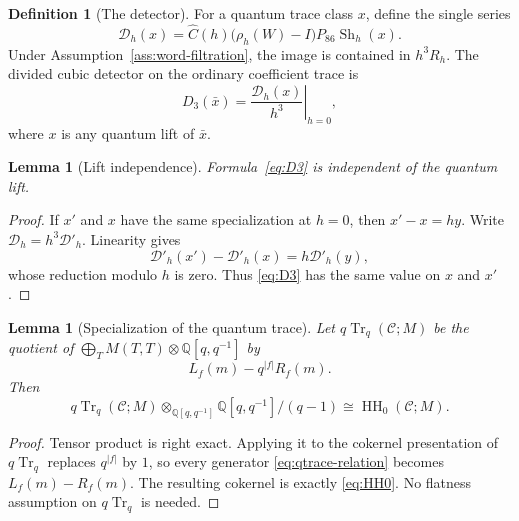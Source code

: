 \documentclass[10pt,reqno]{amsart}
\newtheorem{lemma}[theorem]{Lemma}
\theoremstyle{definition}
\newtheorem{definition}[theorem]{Definition}
\theoremstyle{remark}
\newcommand{\Q}{\mathbb Q}
\newcommand{\HH}{\operatorname{HH}}
\newcommand{\qTr}{q\!\operatorname{Tr}}
\newcommand{\Sh}{\operatorname{Sh}}
\begin{document}
\begin{definition}[The detector]\label{def:detector}
For a quantum trace class $x$, define the single series
\begin{equation}\label{eq:D-h}
\mathcal D_h(x)=
\widehat C(h)\bigl(\rho_h(W)-I\bigr)P_{86}\Sh_h(x).
\end{equation}
Under Assumption~\ref{ass:word-filtration}, the image is contained in
$h^3R_h$.  The divided cubic detector on the ordinary coefficient trace is
\begin{equation}\label{eq:D3}
D_3(\bar x)=\left.\frac{\mathcal D_h(x)}{h^3}\right|_{h=0},
\end{equation}
where $x$ is any quantum lift of $\bar x$.
\end{definition}

\begin{lemma}[Lift independence]\label{lem:lift-independence}
Formula~\eqref{eq:D3} is independent of the quantum lift.
\end{lemma}

\begin{proof}
If $x'$ and $x$ have the same specialization at $h=0$, then
$x'-x=hy$.  Write $\mathcal D_h=h^3\mathcal D'_h$.  Linearity gives
\begin{equation}\label{eq:lift-difference}
\mathcal D'_h(x')-\mathcal D'_h(x)=h\mathcal D'_h(y),
\end{equation}
whose reduction modulo $h$ is zero.  Thus \cref{eq:D3} has the same value on
$x$ and $x'$.
\end{proof}

\begin{lemma}[Specialization of the quantum trace]\label{lem:qtrace-specialization}
Let $\qTr_q(\mathcal C;M)$ be the quotient of
$\bigoplus_T M(T,T)\otimes\Q[q,q^{-1}]$ by
\begin{equation}\label{eq:qtrace-relation}
L_f(m)-q^{|f|}R_f(m).
\end{equation}
Then
\begin{equation}\label{eq:qtrace-to-HH0}
\qTr_q(\mathcal C;M)\otimes_{\Q[q,q^{-1}]}\Q[q,q^{-1}]/(q-1)
\cong\HH_0(\mathcal C;M).
\end{equation}
\end{lemma}

\begin{proof}
Tensor product is right exact.  Applying it to the cokernel presentation of
$\qTr_q$ replaces $q^{|f|}$ by $1$, so every generator
\cref{eq:qtrace-relation} becomes $L_f(m)-R_f(m)$.  The resulting cokernel is
exactly \cref{eq:HH0}.  No flatness assumption on $\qTr_q$ is needed.
\end{proof}
\end{document}
